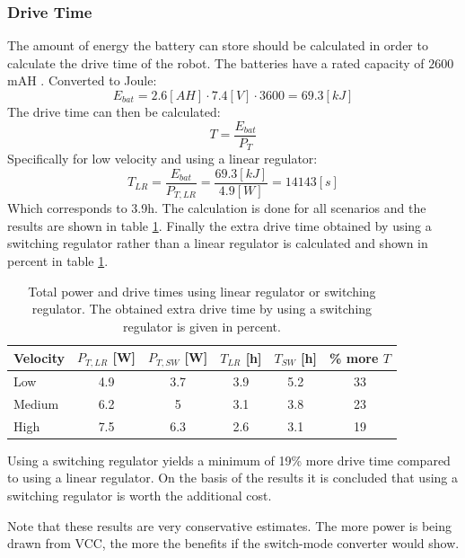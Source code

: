 \subsubsection*{Drive Time}
The amount of energy the battery can store should be calculated in order to calculate the drive time of the robot.
The batteries have a rated capacity of $2600$mAH \cite{battery}.
Converted to Joule: 
$$ E_{bat} = 2.6 [AH] \cdot 7.4 [V]  \cdot 3600 = 69.3 [kJ]$$
The drive time can then be calculated: 
$$ T = \frac{E_{bat}}{P_T} $$
Specifically for low velocity and using a linear regulator:
$$ T_{LR} = \frac{E_{bat}}{P_{T,LR}} = \frac{69.3 [kJ]}{4.9 [W]} = 14143 [s] $$
Which corresponds to 3.9h. The calculation is done for all scenarios and the results are shown in table \ref{tab:drive_time}.
Finally the extra drive time obtained by using a switching regulator rather than a linear regulator is calculated and shown in percent in table \ref{tab:drive_time}.

\begin{table}[h]
	\centering
	\caption{Total power and drive times using linear regulator or switching regulator. The obtained extra drive time by using a switching regulator is given in percent.}
	\label{tab:drive_time}
	\begin{tabular}{|l|c|c|c|c|c|}
		\hline
		\textbf{Velocity} & $P_{T,LR}$ [W]& $P_{T,SW}$ [W]& $T_{LR}$ [h]& $T_{SW}$ [h]& \% \textbf{more} $T$ \\ \hline
		Low       	& 4.9                         & 3.7                               & 3.9              & 5.2                      & 33                 \\ \hline
		Medium  	& 6.2                         & 5                                 & 3.1              & 3.8                      & 23                 \\ \hline
		High      	& 7.5                         & 6.3                               & 2.6              & 3.1                      & 19                 \\ \hline
	\end{tabular}
\end{table}

Using a switching regulator yields a minimum of 19\% more drive time compared to using a linear regulator.
On the basis of the results it is concluded that using a switching regulator is worth the additional cost.

Note that these results are very conservative estimates.
The more power is being drawn from VCC, the more the benefits if the switch-mode converter would show. 

